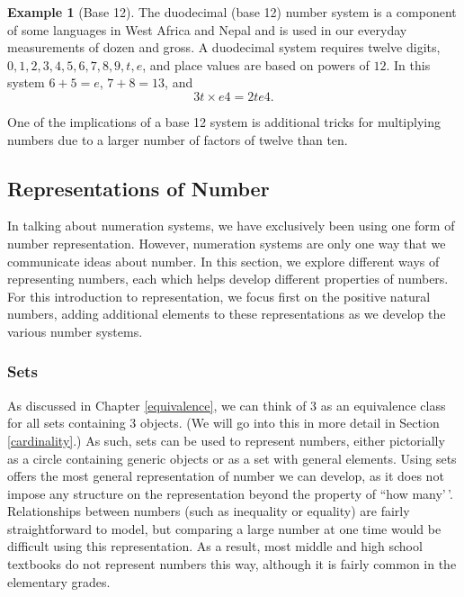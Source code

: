 \documentclass[
]{book}
\theoremstyle{definition}
\theoremstyle{definition}
\newtheorem{example}{Example}[chapter]
\theoremstyle{definition}
\theoremstyle{definition}
\theoremstyle{remark}
\begin{document}
\begin{example}[Base 12]
The duodecimal (base 12) number system is a component of some languages in West Africa and Nepal and is used in our everyday measurements of dozen and gross. A duodecimal system requires twelve digits, \(0,1,2,3,4,5,6,7,8,9,t,e\), and place values are based on powers of \(12\). In this system \(6+5=e\), \(7+8=13\), and
\[3t \times e4 = 2te4.\]

One of the implications of a base 12 system is additional tricks for multiplying numbers due to a larger number of factors of twelve than ten.
\end{example}

\hypertarget{representations-of-number}{%
\subsection{Representations of Number}\label{representations-of-number}}

In talking about numeration systems, we have exclusively been using one form of number representation. However, numeration systems are only one way that we communicate ideas about number. In this section, we explore different ways of representing numbers, each which helps develop different properties of numbers. For this introduction to representation, we focus first on the positive natural numbers, adding additional elements to these representations as we develop the various number systems.

\hypertarget{sets-1}{%
\subsubsection*{Sets}\label{sets-1}}

As discussed in Chapter \ref{equivalence}, we can think of 3 as an equivalence class for all sets containing 3 objects. (We will go into this in more detail in Section \ref{cardinality}.) As such, sets can be used to represent numbers, either pictorially as a circle containing generic objects or as a set with general elements. Using sets offers the most general representation of number we can develop, as it does not impose any structure on the representation beyond the property of ``how many'\,'. Relationships between numbers (such as inequality or equality) are fairly straightforward to model, but comparing a large number at one time would be difficult using this representation. As a result, most middle and high school textbooks do not represent numbers this way, although it is fairly common in the elementary grades.
\end{document}
